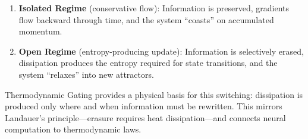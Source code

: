 \documentclass[12pt,letterpaper,twoside]{article}
\begin{document}
\begin{enumerate}
\item \textbf{Isolated Regime} (conservative flow): Information is preserved, gradients flow backward through time, and the system ``coasts'' on accumulated momentum.
\item \textbf{Open Regime} (entropy-producing update): Information is selectively erased, dissipation produces the entropy required for state transitions, and the system ``relaxes'' into new attractors.
\end{enumerate}

Thermodynamic Gating provides a physical basis for this switching: dissipation is produced only where and when information must be rewritten. This mirrors Landauer's principle---erasure requires heat dissipation---and connects neural computation to thermodynamic laws.
\end{document}
